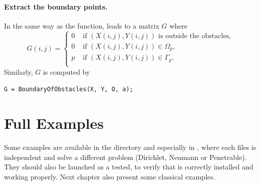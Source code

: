 \paragraph{Extract the boundary points.} In the same way as the \MaskMatrixObstacles function, \BoundaryOfObstacles leads to a matrix $G$ where
$$
G(i,j) = \begin{cases}
0 & \text{ if } (X(i,j),Y(i,j)) \text{ is outside the obstacles,}\\
0 & \text{ if } (X(i,j),Y(i,j)) \in\Omega_p,\\
p & \text{ if } (X(i,j),Y(i,j)) \in\Gamma_p.\\
\end{cases}
$$
Similarly, $G$ is computed by
\begin{lstlisting}
G = BoundaryOfObstacles(X, Y, O, a);
\end{lstlisting}

\section{Full Examples}

Some examples are available in the  directory and especially in , where each files is independent and solve a different problem (Dirichlet, Neumann or Penetrable). They should also be launched as a tested, to verify that \mudiff is correctly installed and working properly. Next chapter also present some classical examples.











